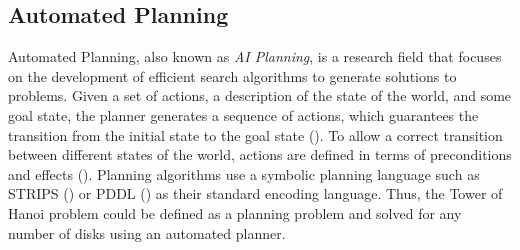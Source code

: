 \subsection{Automated Planning}
Automated Planning, also known as \textit{AI Planning}, is a research field that focuses on the development of efficient search algorithms to generate solutions to problems.
Given a set of actions, a description of the state of the world, and some goal state, the planner generates a sequence of actions, which guarantees the transition from the initial state to the goal state ().
To allow a correct transition between different states of the world, actions are defined in terms of preconditions and effects (). 
Planning algorithms use a symbolic planning language such as STRIPS (\cite{fikes1971strips}) or PDDL (\cite{ghallab2004automated}) as their standard encoding language.
Thus, the Tower of Hanoi problem could be defined as a planning problem and solved for any number of disks using an automated planner.


